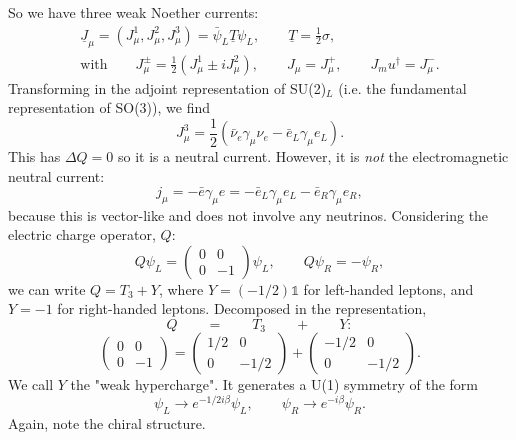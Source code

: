 \documentclass[a4paper,12pt]{article}
\begin{document}
So we have three weak Noether currents:
\begin{equation}
\begin{split}
\underline{J}_\mu = (J_\mu^1, J_\mu^2, J_\mu^3) = \bar{\psi}_L \underline{T} \psi_L, \qquad \underline{T} = \frac{1}{2}\sigma, \\
\text{with} \qquad J_\mu^\pm = \frac{1}{2}(J_\mu^1 \pm iJ_\mu^2), \qquad J_\mu = J_\mu^+, \qquad J_mu^\dagger = J_\mu^-.
\end{split}
\end{equation}
Transforming in the adjoint representation of SU(2)$_L$ (i.e. the fundamental representation of SO(3)), we find
\begin{equation}
J_\mu^3 = \frac{1}{2}(\bar{\nu}_e \gamma_\mu \nu_e - \bar{e}_L \gamma_\mu e_L).
\end{equation}
This has $\Delta Q =0$ so it is a neutral current. However, it is \textit{not} the electromagnetic neutral current:
\begin{equation}
j_\mu = - \bar{e}\gamma_\mu e = - \bar{e}_L \gamma_\mu e_L - \bar{e}_R \gamma_\mu e_R,
\end{equation}
because this is vector-like and does not involve any neutrinos.
Considering the electric charge operator, $Q$:
\[ Q \psi_L = \left( \begin{array}{cc}
0 & 0  \\
0 & -1  \end{array} \right) \psi_L, \qquad
Q \psi_R = - \psi_R, \]
we can write $Q = T_3 + Y$, where $Y = (-1/2) \mathds{1}$ for left-handed leptons, and $Y = -1$ for right-handed leptons. Decomposed in the representation,
\[ Q \qquad = \qquad T_3 \qquad + \qquad Y: \]
\[\left( \begin{array}{cc}
0 & 0  \\
0 & -1  \end{array} \right)=
\left( \begin{array}{cc}
1/2 & 0  \\
0 & -1/2  \end{array} \right) +
\left( \begin{array}{cc}
-1/2 & 0  \\
0 & -1/2  \end{array} \right). \]
We call $Y$ the "weak hypercharge". It generates a U(1) symmetry of the form
\begin{equation}
\psi_L \to e^{-1/2 i \beta}\psi_L,  \qquad \psi_R \to e^{-i \beta}  \psi_R.
\end{equation}
Again, note the chiral structure.
\end{document}
